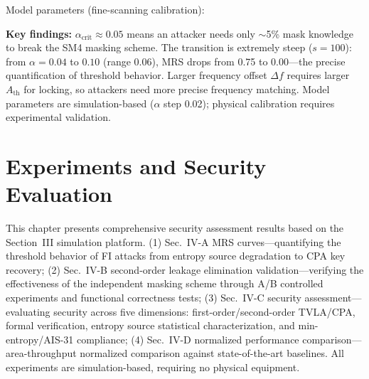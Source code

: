 \documentclass[journal]{IEEEtran}
\begin{document}
Model parameters (fine-scanning calibration):

\begin{table}[t]
\renewcommand{\arraystretch}{1.1}
\caption{Analytical Model Parameters}
\label{tab:model-params}
\end{table}

\textbf{Key findings:} $\alpha_{\text{crit}} \approx 0.05$ means an attacker needs only $\sim$5\% mask knowledge to break the SM4 masking scheme. The transition is extremely steep ($s=100$): from $\alpha=0.04$ to $0.10$ (range 0.06), MRS drops from 0.75 to 0.00---the precise quantification of threshold behavior. Larger frequency offset $\Delta f$ requires larger $A_{\text{th}}$ for locking, so attackers need more precise frequency matching. Model parameters are simulation-based ($\alpha$ step 0.02); physical calibration requires experimental validation.

\section{Experiments and Security Evaluation}

This chapter presents comprehensive security assessment results based on the Section~III simulation platform. (1) Sec.~IV-A MRS curves---quantifying the threshold behavior of FI attacks from entropy source degradation to CPA key recovery; (2) Sec.~IV-B second-order leakage elimination validation---verifying the effectiveness of the independent masking scheme through A/B controlled experiments and functional correctness tests; (3) Sec.~IV-C security assessment---evaluating security across five dimensions: first-order/second-order TVLA/CPA, formal verification, entropy source statistical characterization, and min-entropy/AIS-31 compliance; (4) Sec.~IV-D normalized performance comparison---area-throughput normalized comparison against state-of-the-art baselines. All experiments are simulation-based, requiring no physical equipment.
\end{document}
